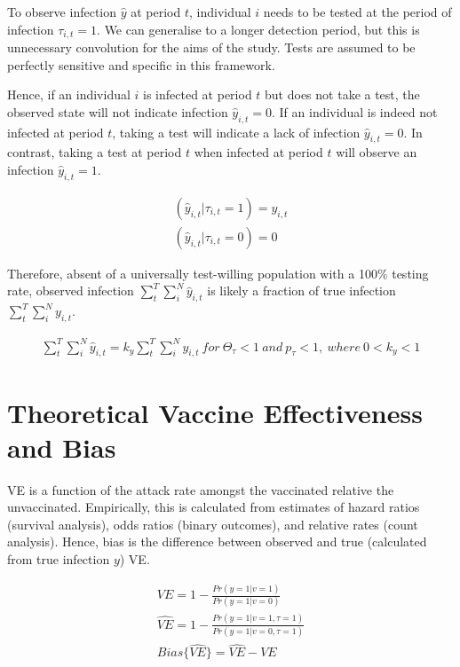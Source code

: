 \documentclass[12pt]{article}
\begin{document}
To observe infection $\hat{y}$ at period $t$, individual $i$ needs to be tested at the period of infection $\tau_{i,t} = 1$. We can generalise to a longer detection period, but this is unnecessary convolution for the aims of the study. Tests are assumed to be perfectly sensitive and specific in this framework.

Hence, if an individual $i$ is infected at period $t$ but does not take a test, the observed state will not indicate infection $\hat{y}_{i,t}=0$. If an individual is indeed not infected at period $t$, taking a test will indicate a lack of infection $\hat{y}_{i,t}=0$. In contrast, taking a test at period $t$ when infected at period $t$ will observe an infection $\hat{y}_{i,t}=1$.

\begin{eqnarray}
	(\hat{y}_{i,t} | \tau_{i,t} = 1) = y_{i,t} \\
	(\hat{y}_{i,t} | \tau_{i,t} = 0) = 0
\end{eqnarray}

Therefore, absent of a universally test-willing population with a 100\% testing rate, observed infection $\sum_{t}^{T} \sum_{i}^{N} \hat{y}_{i,t}$ is likely a fraction of true infection $\sum_{t}^{T} \sum_{i}^{N} y_{i,t}$.

\begin{eqnarray}
	\sum_{t}^{T} \sum_{i}^{N} \hat{y}_{i,t} = k_{y} \sum_{t}^{T} \sum_{i}^{N} y_{i,t} \ for \ \Theta_{\tau} < 1 \ and \ p_{\tau} < 1, \ where\  0 < k_{y} < 1
\end{eqnarray}

\section{Theoretical Vaccine Effectiveness and Bias}
VE is a function of the attack rate amongst the vaccinated relative the unvaccinated. Empirically, this is calculated from estimates of hazard ratios (survival analysis), odds ratios (binary outcomes), and relative rates (count analysis). Hence, bias is the difference between observed and true (calculated from true infection $y$) VE.

\begin{eqnarray}
	VE = 1 - \frac{Pr(y=1 | v=1)}{Pr(y=1 | v=0)} \\ 
	\widehat{VE} = 1 - \frac{Pr(y=1 | v=1, \tau = 1)}{Pr(y=1 | v=0, \tau = 1)} \\
	{Bias}\{\widehat{VE}\} = \widehat{VE} - VE
\end{eqnarray}
\end{document}
